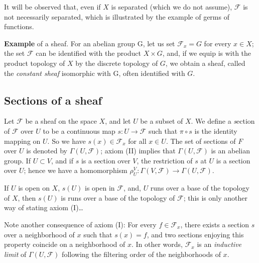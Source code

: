 \documentclass{book}
\newcounter{para}
\begin{document}
It will be observed that, even if $X$ is separated (which we do not assume), $\mathcal F$ is not necessarily separated, which is illustrated by the example of germs of functions. 

\textbf{Example} of a sheaf. For an abelian group G, let us set $\mathcal F_x = G$ for every $x \in X$; the set $\mathcal F$ can be identified with the product $X \times G$, and, if we equip is with the product topology of $X$ by the discrete topology of $G$, we obtain a sheaf, called the \textit{constant sheaf} isomorphic with G, often identified with $G$.

\subsection{Sections of a sheaf}

Let $\mathcal F$ be a sheaf on the space $X$, and let $U$ be a subset of $X$. We define a \textit section of $\mathcal F$ over $U$ to be a continuous map $s: U \rightarrow \mathcal F$ such that $\pi \circ s$ is the identity mapping on $U$. So we have $s(x) \in \mathcal F_x$ for all $x \in U$. The set of sections of $F$ over $U$ is denoted by $\Gamma (U, \mathcal F)$; axiom (II) implies that $\Gamma (U, \mathcal F)$ is an abelian group. If $U \subset V$, and if $s$ is a section over $V$, the restriction of $s$ at $U$ is a section over $U$; hence we have a homomorphism $\rho_U^V: \Gamma (V, \mathcal F) \rightarrow \Gamma (U, \mathcal F)$. 

If $U$ is open on $X$, $s(U)$ is open in $\mathcal F$, and, $U$ runs over a base of the topology of $X$, then $s(U)$ is runs over a base of the topology of $\mathcal F$; this is only another way of stating axiom (I)\dots

Note another consequence of axiom (I): For every $f \in \mathcal F_x$, there exists a section $s$ over a neighborhood of $x$ such that $s(x) = f$, and two sections enjoying this property coincide on a neighborhood of $x$. In other words, $\mathcal F_x$ is an \textit{inductive limit} of $\Gamma (U, \mathcal F)$ following the filtering order of the neighborhoods of $x$. 
\end{document}
